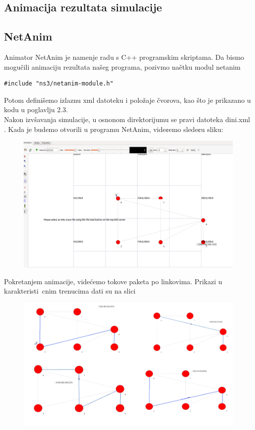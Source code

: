 \documentclass[a4paper,12pt, Projekat]{etf}
\begin{document}
\begin{itemize}
\chapter{Animacija rezultata simulacije}
\section{NetAnim}
Animator NetAnim je namenje radu s C++ programskim skriptama. Da bismo mogu\v cili animaciju rezultata na\v seg programa, pozivmo na\v etku modul netanim
\begin{verbatim}
#include "ns3/netanim-module.h"
\end{verbatim}
Potom defini\v semo izlaznu xml datoteku i polo\v zaje \v cvorova, kao \v sto je prikazano u kodu u poglavlju 2.3.\\
Nakon izv\v savanja simulacije, u osnonom direktorijumu se pravi datoteka dini.xml .
Kada je budemo otvorili u programu NetAnim, vide¢emo slede¢u sliku:\label{fig:stanje0}
\begin{figure}[htb]
\centering
\includegraphics[width=.7\textwidth]{slike/0.png}
\caption{}
\label{fig:stanje0}
\end{figure}

Pokretanjem animacije, vide\' cemo tokove paketa po linkovima. Prikazi u karakteristi\ cnim trenucima dati su na slici \label{fig:stanje1}
\begin{figure}[htb]
\centering
\includegraphics[width=.7\textwidth]{slike/1.png}
\caption{}
\label{fig:stanje1}
\end{figure}

\end{itemize}
\end{document}
